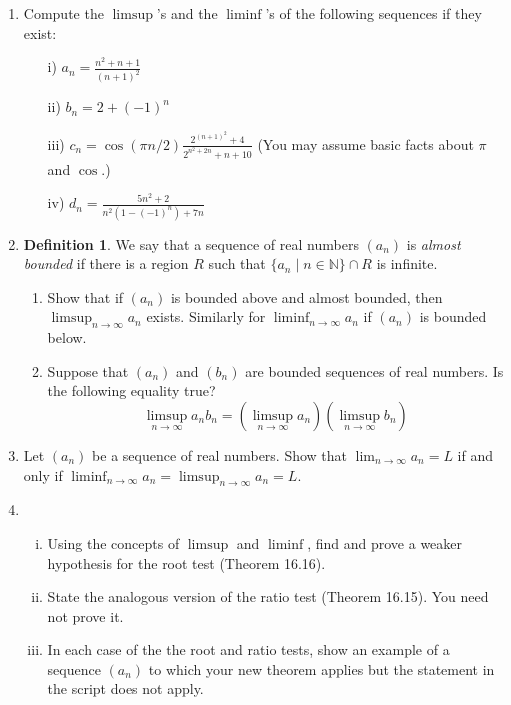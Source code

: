 \documentclass[openany, amssymb, psamsfonts]{amsart}
\newcommand{\bbN}{\mathbb{N}}
\theoremstyle{definition}
\newtheorem{defn}{Definition}[section]
\numberwithin{equation}{section}
\begin{document}
\begin{enumerate}
\begin{enumerate}
\item
	Compute the $\limsup$'s and the $\liminf$'s of the following sequences if they exist:
	\begin{enumerate}
		\item[i)] $a_n = \frac{n^2+ n+1}{(n+1)^2}$
		\item[ii)] $b_n =2 + (-1)^n$
		\item[iii)] $c_n = \cos(\pi n / 2)\frac{2^{(n+1)^2}+4}{2^{n^2 + 2n} + n + 10}$ (You may assume basic facts about $\pi$ and $\cos.$)
		\item[iv)] $d_n = \frac{5n^2 + 2}{n^2(1 - (-1)^n) + 7n}$
	\end{enumerate}






\item


\begin{defn}
We say that a sequence of real numbers $(a_n)$ is {\em almost bounded} if there is a region $R$ such that $\{a_n\mid n \in \bbN\} \cap R$ is infinite.
\end{defn}

\begin{enumerate}
	\item	Show that if $(a_n)$ is bounded above and almost bounded, then $\limsup_{n\to\infty} a_n$ exists.  Similarly for $\liminf_{n\to\infty} a_n$ if $(a_n)$ is bounded below.
	\item   Suppose that $(a_n)$ and $(b_n)$ are bounded sequences of real numbers.  Is the following equality true?
	\[
		\limsup_{n\to\infty} a_n b_n = \left( \limsup_{n\to\infty} a_n\right)\left( \limsup_{n\to\infty} b_n\right)
	\]
\end{enumerate}

\item

	Let $(a_n)$ be a sequence of real numbers.  Show that $\lim_{n\to\infty} a_n = L$ if and only if $\liminf_{n\to\infty} a_n = \limsup_{n\to\infty} a_n = L$.





\item
	\begin{enumerate}[(i)]
		\item Using the concepts of $\limsup$ and $\liminf$, find and prove a weaker hypothesis for the root test (Theorem 16.16).
		\item State the analogous version of the ratio test (Theorem 16.15).  You need not prove it.
		\item In each case of the the root and ratio tests, show an example of a sequence $(a_n)$ to which your new theorem applies but the statement in the script does not apply.
	\end{enumerate}





\end{enumerate}
\end{enumerate}
\end{document}

